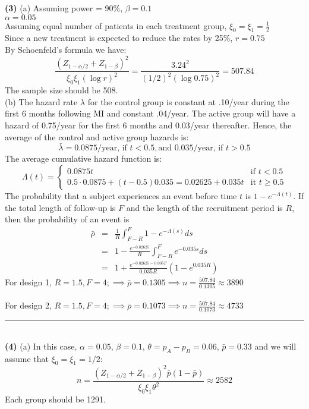 \documentclass[11pt,a4paper]{article}
\begin{document}
\noindent
\textbf{(3)} 
(a) Assuming power = 90\%, $\beta = 0.1$ \\
$\alpha = 0.05$ \\
Assuming equal number of patients in each treatment group, $\xi_0=\xi_1=\frac{1}{2}$ \\
Since a new treatment is expected to reduce the rates by 25\%, $r=0.75$ \\
By Schoenfeld’s formula we have:
\[ \dfrac{(Z_{1-\alpha/2}+Z_{1-\beta})^ 2}{\xi_0\xi_1(\log r)^2} = \dfrac{3.24^ 2}{(1/2)^2(\log 0.75)^2} = 507.84 \]
The sample size should be 508.\\
\noindent
(b) The hazard rate $\lambda$ for the control group is constant at .10/year during the first 6 months following MI and constant .04/year. The active group will have a hazard of 0.75/year for the first 6 months and 0.03/year thereafter. Hence, the average of the control and active group hazards is:
\[ \bar{\lambda} = 0.0875/\text{year, if } t < 0.5, \text{and } 0.035/\text{year, if } t > 0.5\]
The average cumulative hazard function is: 
\begin{equation*}
\Lambda(t) = \begin{cases}
0.0875t &\text{if } t < 0.5 \\
0.5 \cdot 0.0875 + (t-0.5) 0.035 = 0.02625 + 0.035t &\text{it } t \ge 0.5
\end{cases}
\end{equation*}
The probability that a subject experiences an event before time $t$ is $1 - e^{-\Lambda(t)}$. If the total length of follow-up is $F$ and the length of the recruitment period is $R$, then the probability of an event is
\begin{eqnarray*}
\bar{\rho} &=& \frac{1}{R} \int_{F - R}^{F} 1 - e^{-\Lambda(s)}ds \\
           &=& 1 - \frac{e^{-0.02625}}{R} \int_{F - R}^{F} e^{-0.035s} ds \\
           &=& 1 + \frac{e^{-0.02625 - 0.035F}}{0.035R}\left(1 - e^{0.035R} \right)
\end{eqnarray*}
For design 1, $R = 1.5, F = 4; \implies \bar{\rho} = 0.1305 \implies n = \frac{507.84}{0.1305} \approx 3890 $ \\ \\
For design 2, $R = 1.5, F = 4; \implies \bar{\rho} = 0.1073 \implies n = \frac{507.84}{0.1073} \approx 4733 $ \\
\noindent\rule{16cm}{0.4pt} \\
\noindent
\textbf{(4)} 
(a) In this case, $\alpha=0.05$, $\beta=0.1$, $\theta=p_A-p_B=0.06$, $\bar{p}=0.33$ and we will assume that $\xi_0=\xi_1=1/2$:
\[ n = \dfrac{(Z_{1-\alpha/2}+Z_{1-\beta})^2\bar{p}(1-\bar{p})}{\xi_0\xi_1\theta^2} \approx 2582 \]
Each group should be 1291.
\end{document}
